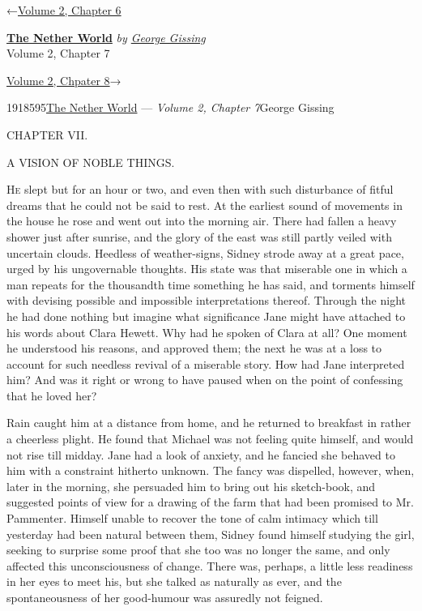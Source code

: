 \hypertarget{headerContainer}{}
\hypertarget{navigationHeader}{}
\protect\hypertarget{headerprevious}{}{←\href{/wiki/The_Nether_World/Volume_2/Chapter_6}{Volume
2, Chapter 6}}

\textbf{\protect\hypertarget{header_title_text}{}{\href{/wiki/The_Nether_World}{The
Nether World}}} \emph{by
\href{/wiki/Author:George_Gissing}{\protect\hypertarget{header_author_text}{}{{George
Gissing}}}}\\
\protect\hypertarget{header_section_text}{}{Volume 2, Chapter 7}

\protect\hypertarget{headernext}{}{\href{/wiki/The_Nether_World/Volume_2/Chapter_8}{Volume
2, Chpater 8}→}

\hypertarget{navigationNotes}{}

\hypertarget{ws-data}{}
\protect\hypertarget{ws-article-id}{}{1918595}\protect\hypertarget{ws-title}{}{\href{/wiki/The_Nether_World}{The
Nether World} --- \emph{Volume 2, Chapter
7}}\protect\hypertarget{ws-author}{}{George Gissing}

{\protect\hypertarget{121}{}{}}

{CHAPTER VII.}

A VISION OF NOBLE THINGS.

\textsc{He} slept but for an hour or two, and even then with such
disturbance of fitful dreams that he could not be said to rest. At the
earliest sound of movements in the house he rose and went out into the
morning air. There had fallen a heavy shower just after sunrise, and the
glory of the east was still partly veiled with uncertain clouds.
Heedless of weather-signs, Sidney strode away at a great pace, urged by
his ungovernable thoughts. His state was that miserable one in which a
man repeats for the thousandth time something he has said, and torments
himself with devising possible and impossible interpretations thereof.
Through the night he had done nothing but imagine what significance Jane
might have attached to his words {\protect\hypertarget{122}{}{}}about
Clara Hewett. Why had he spoken of Clara at all? One moment he
understood his reasons, and approved them; the next he was at a loss to
account for such needless revival of a miserable story. How had Jane
interpreted him? And was it right or wrong to have paused when on the
point of confessing that he loved her?

Rain caught him at a distance from home, and he returned to breakfast in
rather a cheerless plight. He found that Michael was not feeling quite
himself, and would not rise till midday. Jane had a look of anxiety, and
he fancied she behaved to him with a constraint hitherto unknown. The
fancy was dispelled, however, when, later in the morning, she persuaded
him to bring out his sketch-book, and suggested points of view for a
drawing of the farm that had been promised to Mr. Pammenter. Himself
unable to recover the tone of calm intimacy which till yesterday had
been natural between them, Sidney found himself studying the girl,
seeking to surprise some proof that she too was no longer the
{\protect\hypertarget{123}{}{}}same, and only affected this
unconsciousness of change. There was, perhaps, a little less readiness
in her eyes to meet his, but she talked as naturally as ever, and the
spontaneousness of her good-humour was assuredly not feigned.

